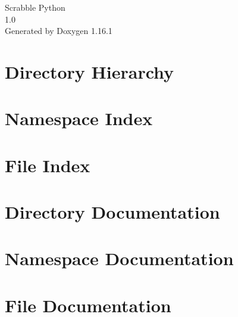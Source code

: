 \documentclass[twoside]{book}
\newcommand{\+}{\discretionary{\mbox{\scriptsize$\hookleftarrow$}}{}{}}
\newcommand{\clearemptydoublepage}{%
    \newpage{\pagestyle{empty}\cleardoublepage}%
  }
\begin{document}
  \raggedbottom
    \hypersetup{pageanchor=false,
                bookmarksnumbered=true,
                pdfencoding=unicode
               }
  \begin{titlepage}
  \vspace*{7cm}
  \begin{center}%
  {\Large Scrabble Python}\\
  [1ex]\large 1.\+0 \\
  \vspace*{1cm}
  {\large Generated by Doxygen 1.16.1}\\
  \end{center}
  \end{titlepage}
  \clearemptydoublepage
  \tableofcontents
  \clearemptydoublepage
  \hypersetup{pageanchor=true}
\chapter{Directory Hierarchy}

\chapter{Namespace Index}

\chapter{File Index}

\chapter{Directory Documentation}

\chapter{Namespace Documentation}

\chapter{File Documentation}


  \backmatter
  \newpage
  \clearemptydoublepage
  \printindex
\end{document}

